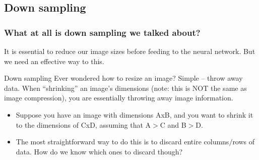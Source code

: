 \documentclass{beamer}
\begin{document}
\subsection{Down sampling}
\begin{frame}
\frametitle{What at all is down sampling we talked about?}
It is essential to reduce our image sizes before feeding to the neural network. But we need an effective way to this.
\begin{block}{Down sampling}
Ever wondered how to resize an image? Simple – throw away data. When “shrinking” an image’s dimensions (note: this is NOT the same as image compression), you are essentially throwing away image information.
\end{block}

\begin{itemize}
    \item Suppose you have an image with dimensions AxB, and you want to shrink it to the dimensions of CxD, assuming that A$>$C and B$>$D.
    \item The most straightforward way to do this is to discard entire columns$/$rows of data. How do we know which ones to discard though?
    
\end{itemize}
\end{frame}

\end{document}
